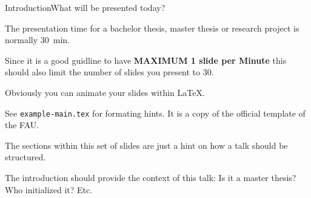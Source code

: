 \begin{frame}{Introduction}{What will be presented today?}

  The presentation time for a bachelor thesis, master thesis or
  research project is normally \qty{30}{\minute}.

  Since it is a good guidline to have \textbf{MAXIMUM 1 slide per
  Minute} this should also limit the number of slides you present to 30.

  Obviously you can animate your slides within \LaTeX.

  See \texttt{example-main.tex} for formating hints. It is a copy of
  the official template of the FAU.

  The sections within this set of slides are just a hint on how a
  talk should be structured.

  The introduction should provide the context of this talk: Is it a
  master thesis? Who initialized it? Etc.
\end{frame}
